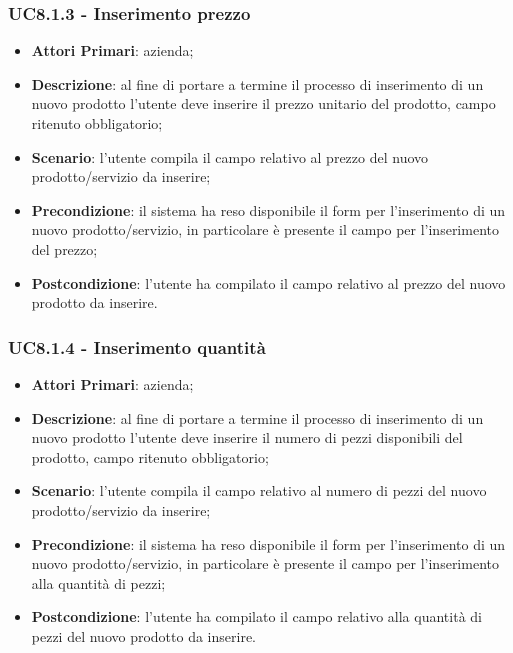\subsubsection{UC8.1.3 - Inserimento prezzo}
\begin{itemize}
	\item \textbf{Attori Primari}: azienda;
	\item \textbf{Descrizione}: al fine di portare a termine il processo di inserimento di un nuovo prodotto l'utente deve inserire il prezzo unitario del prodotto, campo ritenuto obbligatorio;
	\item \textbf{Scenario}: l'utente compila il campo relativo al prezzo del nuovo prodotto/servizio da inserire;
	\item \textbf{Precondizione}: il sistema ha reso disponibile il form per l'inserimento di un nuovo prodotto/servizio, in particolare è presente il campo per l'inserimento del prezzo;
	\item \textbf{Postcondizione}: l'utente ha compilato il campo relativo al prezzo del nuovo prodotto da inserire.
\end{itemize}
\subsubsection{UC8.1.4 - Inserimento quantità}
\begin{itemize}
	\item \textbf{Attori Primari}: azienda;
	\item \textbf{Descrizione}: al fine di portare a termine il processo di inserimento di un nuovo prodotto l'utente deve inserire il numero di pezzi disponibili del prodotto, campo ritenuto obbligatorio;
	\item \textbf{Scenario}: l'utente compila il campo relativo al numero di pezzi del nuovo prodotto/servizio da inserire;
	\item \textbf{Precondizione}: il sistema ha reso disponibile il form per l'inserimento di un nuovo prodotto/servizio, in particolare è presente il campo per l'inserimento alla quantità di pezzi;
	\item \textbf{Postcondizione}: l'utente ha compilato il campo relativo alla quantità di pezzi del nuovo prodotto da inserire.
\end{itemize}
